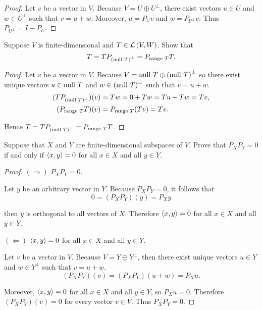 \begin{proof}
    Let $v$ be a vector in $V$. Because $V = U\oplus U^{\bot}$, there exist vectors $u\in U$ and $w\in U^{\bot}$ such that $v = u + w$. Moreover, $u = P_{U}v$ and $w = P_{U^{\bot}}v$. Thus $P_{U^{\bot}} = I - P_{U}$.
\end{proof}
\newpage

\begin{exercise}
    Suppose $V$ is finite-dimensional and $T\in\mathcal{L}\left({V, W}\right)$. Show that
    \[
        T = TP_{{(\operatorname{null}\,{T})}^{\bot}} = P_{\operatorname{range}\,{T}}T.
    \]
\end{exercise}

\begin{proof}
    Let $v$ be a vector in $V$. Because $V = \operatorname{null}\,{T} \oplus {(\operatorname{null}\,{T})}^{\bot}$ so there exist unique vectors $u\in\operatorname{null}\,{T}$ and $w\in {(\operatorname{null}\,{T})}^{\bot}$ such that $v = u + w$.
    \begin{align*}
        (TP_{{(\operatorname{null}\,{T})}^{\bot}})(v) & = Tw = 0 + Tw = Tu + Tw = Tv, \\
        (P_{\operatorname{range}\,{T}}T)(v)             & = P_{\operatorname{range}\,{T}}(Tv) = Tv.
    \end{align*}

    Hence $T = TP_{{(\operatorname{null}\,{T})}^{\bot}} = P_{\operatorname{range}\,{T}}T$.
\end{proof}
\newpage

\begin{exercise}
    Suppose that $X$ and $Y$ are finite-dimensional subspaces of $V$. Prove that $P_{X}P_{Y} = 0$ if and only if $\left\langle{x, y}\right\rangle = 0$ for all $x\in X$ and all $y\in Y$.
\end{exercise}

\begin{proof}
    $(\Rightarrow)$ $P_{X}P_{Y} = 0$.

    Let $y$ be an arbitrary vector in $Y$. Because $P_{X}P_{Y} = 0$, it follows that
    \[
        0 = (P_{X}P_{Y})(y) = P_{X}y
    \]

    then $y$ is orthogonal to all vectors of $X$. Therefore $\left\langle{x, y}\right\rangle = 0$ for all $x\in X$ and all $y\in Y$.

    \bigskip

    $(\Leftarrow)$ $\left\langle{x, y}\right\rangle = 0$ for all $x\in X$ and all $y\in Y$.

    Let $v$ be a vector in $V$. Because $V = Y\oplus Y^{\bot}$, then there exist unique vectors $u\in Y$ and $w\in Y^{\bot}$ such that $v = u + w$.
    \[
        (P_{X}P_{Y})(v) = (P_{X}P_{Y})(u + w) = P_{X}u.
    \]

    Moreover, $\left\langle{x, y}\right\rangle = 0$ for all $x\in X$ and all $y\in Y$, so $P_{X}u = 0$. Therefore $(P_{X}P_{Y})(v) = 0$ for every vector $v\in V$. Thus $P_{X}P_{Y} = 0$.
\end{proof}
\newpage


